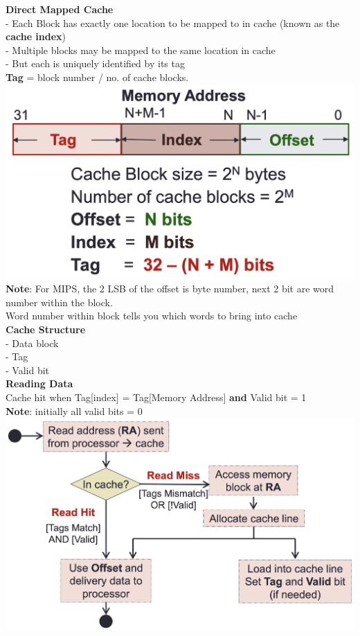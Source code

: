 \documentclass[10pt, a4paper]{article}
\newcommand{\highlight}[1]{{\color{red}\textbf{#1}}}
\begin{document}
\begin{multicols*}{3}
		\textbf{Direct Mapped Cache}\\
		- Each Block has exactly one location to be mapped to in cache (known as the \highlight{cache index})\\
		- Multiple blocks may be mapped to the same location in cache\\
		- But each is uniquely identified by its tag\\
		\highlight{Tag} = block number / no. of cache blocks.\\

		\includegraphics[scale=.3]{./assets/DirectCacheBits}\\
		\highlight{Note}: For MIPS, the 2 LSB of the offset is byte number, next 2 bit are word number within the block.\\
		Word number within block tells you which words to bring into cache\\

		\textbf{Cache Structure}\\
		- Data block\\
		- Tag\\
		- Valid bit\\

		\textbf{Reading Data}\\
		Cache hit when Tag[index] = Tag[Memory Address] \highlight{and}
		Valid bit = 1\\
		\highlight{Note}: initially all valid bits = 0\\
		\includegraphics[scale=.28]{./assets/readCacheData}\\


\end{multicols*}
\end{document}
